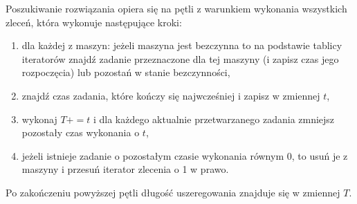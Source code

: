 \documentclass[10pt,a4paper]{article}
\begin{document}
Poszukiwanie rozwiązania opiera się na pętli z warunkiem wykonania wszystkich
zleceń, która wykonuje następujące kroki:
\begin{enumerate}
    \item dla każdej z maszyn: jeżeli maszyna jest bezczynna to na podstawie
      tablicy iteratorów znajdź zadanie przeznaczone dla tej maszyny (i zapisz
      czas jego rozpoczęcia) lub pozostań w stanie bezczynności,
    \item znajdź czas zadania, które kończy się najwcześniej i zapisz w zmiennej
      $t$,
    \item wykonaj $T += t$ i dla każdego aktualnie przetwarzanego zadania
      zmniejsz pozostały czas wykonania o $t$,
    \item jeżeli istnieje zadanie o pozostałym czasie wykonania równym 0, to
      usuń je z maszyny i przesuń iterator zlecenia o 1 w prawo.
\end{enumerate}

Po zakończeniu powyższej pętli długość uszeregowania znajduje się w zmiennej
$T$. 
\end{document}
